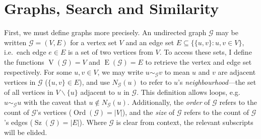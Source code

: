 \documentclass{mpaper}
\begin{document}
\section{Graphs, Search and Similarity}
\label{sec:graph-search}

First, we must define graphs more precisely.
An undirected graph $\mathcal{G}$ may be written $\mathcal{G} = (V,E)$ for a vertex set $V$ and an edge set $E \subseteq \lbrace \lbrace u,v \rbrace : u,v \in V \rbrace $, i.e.\ each edge $e \in E$ is a set of two vertices from $V$.
To access these sets, I define the functions $\operatorname{V}(\mathcal{G})=V$ and $\operatorname{E}(\mathcal{G})=E$ to retrieve the vertex and edge set respectively.
For some $u,v \in V$, we may write $u \sim_\mathcal{G} v$ to mean $u$ and $v$ are adjacent vertices in $\mathcal{G}$ ($\lbrace u,v \rbrace \in E$), and use $N_\mathcal{G}(u)$ to refer to $u$'s \emph{neighbourhood}---the set of all vertices in $V \backslash \lbrace u \rbrace$ adjacent to $u$ in $\mathcal{G}$.
This definition allows loops, e.g.\ $u \sim_\mathcal{G} u$ with the caveat that $u \notin N_\mathcal{G}(u)$.
Additionally, the \emph{order} of $\mathcal{G}$ refers to the count of $\mathcal{G}$'s vertices ($\operatorname{Ord}(\mathcal{G})=|V|$), and the \emph{size} of $\mathcal{G}$ refers to the count of $\mathcal{G}$'s edges ($\operatorname{Sz}(\mathcal{G})=|E|$).
Where $\mathcal{G}$ is clear from context, the relevant subscripts will be elided.
\end{document}
